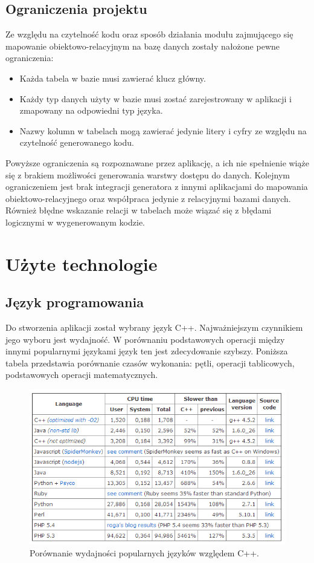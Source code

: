 \documentclass[12pt]{report}
\begin{document}
\subsection{Ograniczenia projektu}
	\indent Ze względu na czytelność kodu oraz sposób działania modułu zajmującego się mapowanie obiektowo-relacyjnym na bazę danych zostały nałożone pewne ograniczenia:
	\begin{itemize}
	\item{Każda tabela w bazie musi zawierać klucz główny.}
	\item{Każdy typ danych użyty w bazie musi zostać zarejestrowany w aplikacji i zmapowany na odpowiedni typ języka.}
	\item{Nazwy kolumn w tabelach mogą zawierać jedynie litery i cyfry ze względu na czytelność generowanego kodu.}
	\end{itemize}
	\indent Powyższe ograniczenia są rozpoznawane przez aplikację, a ich nie spełnienie wiąże się z brakiem możliwości generowania warstwy dostępu do danych. Kolejnym ograniczeniem jest brak integracji generatora z innymi aplikacjami do mapowania obiektowo-relacyjnego oraz współpraca jedynie z relacyjnymi bazami danych. Również błędne wskazanie relacji w tabelach może wiązać się z błędami logicznymi w wygenerowanym kodzie.
\section{Użyte technologie}
\subsection{Język programowania}
Do stworzenia aplikacji został wybrany język C++. Najważniejszym czynnikiem jego wyboru jest wydajność. W porównaniu podstawowych operacji między innymi popularnymi językami język ten jest zdecydowanie szybszy. Poniższa tabela przedstawia porównanie czasów wykonania: pętli, operacji tablicowych, podstawowych operacji matematycznych.
\begin{figure}[h]
	\centering
	\includegraphics[width=1\textwidth]{images/c++test.png}
	\caption{Porównanie wydajności popularnych języków względem C++. \cite{c++testimg}}
\end{figure}
\FloatBarrier
\end{document}
